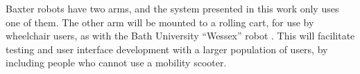 \documentclass[letterpaper, 10 pt, conference]{ieeeconf}
\begin{document}
Baxter robots have two arms, and the system presented in this work only uses one of them. 
The other arm will be mounted to a rolling cart, for use by wheelchair users, as with the Bath University ``Wessex'' robot \cite{edwards2006design}.
This will facilitate testing and user interface development with a larger population of users, by including people who cannot use a mobility scooter. 



\end{document}
